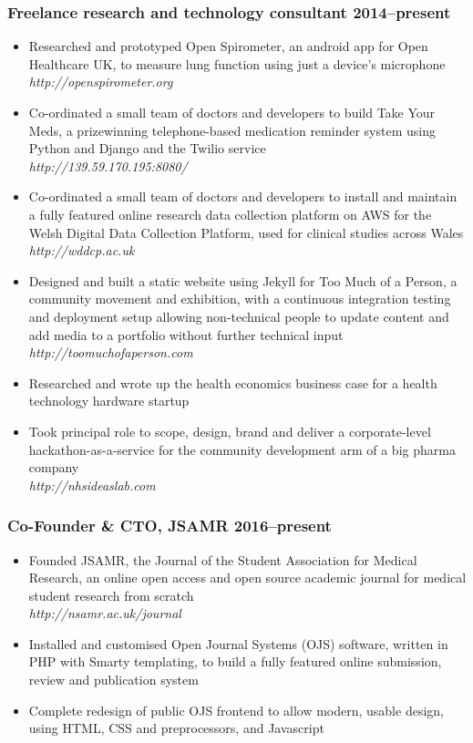 \documentclass[a4paper, oneside, final, 11pt]{scrartcl} %
\begin{document}
\subsubsection*{Freelance research and technology consultant \hfill 2014--present}  
\normalfont
\begin{itemize}
	\item Researched and prototyped Open Spirometer, an android app for Open Healthcare UK, to measure lung function using just a device's microphone\\
	\textit{http://openspirometer.org}
	\item Co-ordinated a small team of doctors and developers to build Take Your Meds, a prizewinning telephone-based medication reminder system using Python and Django and the Twilio service\\
	\textit{http://139.59.170.195:8080/}
	\item Co-ordinated a small team of doctors and developers to install and maintain a fully featured online research data collection platform on AWS for the Welsh Digital Data Collection Platform, used for clinical studies across Wales\\
	\textit{http://wddcp.ac.uk}
	\item Designed and built a static website using Jekyll for Too Much of a Person, a community movement and exhibition, with a continuous integration testing and deployment setup allowing non-technical people to update content and add media to a portfolio without further technical input\\
	\textit{http://toomuchofaperson.com}
	\item Researched and wrote up the health economics business case for a health technology hardware startup
	\item Took principal role to scope, design, brand and deliver a corporate-level hackathon-as-a-service for the community development arm of a big pharma company\\
	\textit{http://nhsideaslab.com}
\end{itemize}

\smallskip 

\subsubsection*{Co-Founder \& CTO, JSAMR \hfill 2016--present} 
\normalfont
\begin{itemize}
	\item Founded JSAMR, the Journal of the Student Association for Medical Research, an online open access and open source academic journal for medical student research from scratch \\
	\textit{http://nsamr.ac.uk/journal}
	\item Installed and customised Open Journal Systems (OJS) software, written in PHP with Smarty templating, to build a fully featured online submission, review and publication system
	\item Complete redesign of public OJS frontend to allow modern, usable design, using HTML, CSS and preprocessors, and Javascript
\end{itemize}
\end{document}
